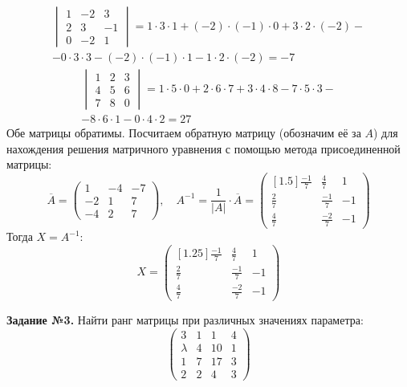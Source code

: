 \documentclass[a4paper, 12pt]{article}
\begin{document}
\begin{gather*}
    \begin{vmatrix}
        1 & -2 & 3 \\ 
        2 & 3 & -1 \\ 
        0 & -2 & 1
    \end{vmatrix} = 1\cdot3\cdot1+(-2)\cdot(-1)\cdot0+3\cdot2\cdot(-2)- \\ 
    - 0\cdot3\cdot3-(-2)\cdot(-1)\cdot1-1\cdot2\cdot(-2) = -7 
\end{gather*}
\begin{gather*}
    \begin{vmatrix}
        1 & 2 & 3 \\ 
        4 & 5 & 6 \\ 
        7 & 8 & 0
    \end{vmatrix} = 1\cdot5\cdot0+2\cdot6\cdot7+3\cdot4\cdot8-7\cdot5\cdot3- \\
    -8\cdot6\cdot1-0\cdot4\cdot2 = 27  
\end{gather*}
Обе матрицы обратимы. Посчитаем обратную матрицу (обозначим её за $A$) для нахождения решения матричного уравнения с помощью метода присоединенной матрицы:
\[
\overline{A} = 
\begin{pmatrix}
    1 & -4 & -7 \\
    -2 & 1 & 7 \\
    -4 & 2 & 7
\end{pmatrix}, \quad  A^{-1} = \frac{1}{|A|} \cdot \overline{A} = 
\begin{pmatrix}[1.5]
    \frac{-1}{7} & \frac{4}{7} & 1 \\
    \frac{2}{7} & \frac{-1}{7} & -1 \\
    \frac{4}{7} & \frac{-2}{7} & -1
\end{pmatrix}
\]
Тогда $X=A^{-1}$:
\[
X = 
\begin{pmatrix}[1.25]
    \frac{-1}{7} & \frac{4}{7} & 1 \\
    \frac{2}{7} & \frac{-1}{7} & -1 \\
    \frac{4}{7} & \frac{-2}{7} & -1
\end{pmatrix}
\]

\newpage

\textbf{Задание №3.} Найти ранг матрицы при различных значениях параметра:
\[
\begin{pmatrix}
    3 & 1 & 1 & 4 \\ 
    \lambda & 4 & 10 & 1 \\ 
    1 & 7 & 17 & 3 \\
    2 & 2 & 4 & 3 
\end{pmatrix}
\]
\end{document}
